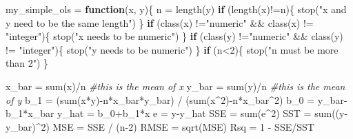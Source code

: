 \documentclass[
]{article}
\newenvironment{Shaded}{\begin{snugshade}}{\end{snugshade}}
\newcommand{\CommentTok}[1]{\textcolor[rgb]{0.56,0.35,0.01}{\textit{#1}}}
\newcommand{\ControlFlowTok}[1]{\textcolor[rgb]{0.13,0.29,0.53}{\textbf{#1}}}
\newcommand{\DecValTok}[1]{\textcolor[rgb]{0.00,0.00,0.81}{#1}}
\newcommand{\FunctionTok}[1]{\textcolor[rgb]{0.00,0.00,0.00}{#1}}
\newcommand{\NormalTok}[1]{#1}
\newcommand{\OtherTok}[1]{\textcolor[rgb]{0.56,0.35,0.01}{#1}}
\newcommand{\SpecialCharTok}[1]{\textcolor[rgb]{0.00,0.00,0.00}{#1}}
\newcommand{\StringTok}[1]{\textcolor[rgb]{0.31,0.60,0.02}{#1}}
\begin{document}
\begin{Shaded}
\begin{Highlighting}[]
\NormalTok{my\_simple\_ols }\OtherTok{=} \ControlFlowTok{function}\NormalTok{(x, y)\{}
\NormalTok{  n }\OtherTok{=} \FunctionTok{length}\NormalTok{(y)}
  \ControlFlowTok{if}\NormalTok{ (}\FunctionTok{length}\NormalTok{(x)}\SpecialCharTok{!=}\NormalTok{n)\{}
    \FunctionTok{stop}\NormalTok{(}\StringTok{"x and y need to be the same length"}\NormalTok{)}
\NormalTok{  \}}
  \ControlFlowTok{if}\NormalTok{ (}\FunctionTok{class}\NormalTok{(x) }\SpecialCharTok{!=}\StringTok{"numeric"} \SpecialCharTok{\&\&} \FunctionTok{class}\NormalTok{(x) }\SpecialCharTok{!=} \StringTok{"integer"}\NormalTok{)\{}
    \FunctionTok{stop}\NormalTok{(}\StringTok{"x needs to be numeric"}\NormalTok{)}
\NormalTok{  \}}
  \ControlFlowTok{if}\NormalTok{ (}\FunctionTok{class}\NormalTok{(y) }\SpecialCharTok{!=}\StringTok{"numeric"} \SpecialCharTok{\&\&} \FunctionTok{class}\NormalTok{(y) }\SpecialCharTok{!=} \StringTok{"integer"}\NormalTok{)\{}
    \FunctionTok{stop}\NormalTok{(}\StringTok{"y needs to be numeric"}\NormalTok{)}
\NormalTok{  \}}
  \ControlFlowTok{if}\NormalTok{ (n}\SpecialCharTok{\textless{}}\DecValTok{2}\NormalTok{)\{}
    \FunctionTok{stop}\NormalTok{(}\StringTok{"n must be more than 2"}\NormalTok{)}
\NormalTok{  \}}

\NormalTok{  x\_bar }\OtherTok{=} \FunctionTok{sum}\NormalTok{(x)}\SpecialCharTok{/}\NormalTok{n }\CommentTok{\#this is the mean of x}
\NormalTok{  y\_bar }\OtherTok{=} \FunctionTok{sum}\NormalTok{(y)}\SpecialCharTok{/}\NormalTok{n }\CommentTok{\#this is the mean of y}
\NormalTok{  b\_1 }\OtherTok{=}\NormalTok{ (}\FunctionTok{sum}\NormalTok{(x}\SpecialCharTok{*}\NormalTok{y)}\SpecialCharTok{{-}}\NormalTok{n}\SpecialCharTok{*}\NormalTok{x\_bar}\SpecialCharTok{*}\NormalTok{y\_bar) }\SpecialCharTok{/}\NormalTok{ (}\FunctionTok{sum}\NormalTok{(x}\SpecialCharTok{\^{}}\DecValTok{2}\NormalTok{)}\SpecialCharTok{{-}}\NormalTok{n}\SpecialCharTok{*}\NormalTok{x\_bar}\SpecialCharTok{\^{}}\DecValTok{2}\NormalTok{)}
\NormalTok{  b\_0 }\OtherTok{=}\NormalTok{ y\_bar}\SpecialCharTok{{-}}\NormalTok{b\_1}\SpecialCharTok{*}\NormalTok{x\_bar}
\NormalTok{  y\_hat }\OtherTok{=}\NormalTok{ b\_0}\SpecialCharTok{+}\NormalTok{b\_1}\SpecialCharTok{*}\NormalTok{x}
\NormalTok{  e }\OtherTok{=}\NormalTok{ y}\SpecialCharTok{{-}}\NormalTok{y\_hat}
\NormalTok{  SSE }\OtherTok{=} \FunctionTok{sum}\NormalTok{(e}\SpecialCharTok{\^{}}\DecValTok{2}\NormalTok{)}
\NormalTok{  SST }\OtherTok{=} \FunctionTok{sum}\NormalTok{((y}\SpecialCharTok{{-}}\NormalTok{y\_bar)}\SpecialCharTok{\^{}}\DecValTok{2}\NormalTok{)}
\NormalTok{  MSE }\OtherTok{=}\NormalTok{ SSE }\SpecialCharTok{/}\NormalTok{ (n}\DecValTok{{-}2}\NormalTok{)}
\NormalTok{  RMSE }\OtherTok{=} \FunctionTok{sqrt}\NormalTok{(MSE)}
\NormalTok{  Rsq }\OtherTok{=} \DecValTok{1} \SpecialCharTok{{-}}\NormalTok{ SSE}\SpecialCharTok{/}\NormalTok{SST}
  

\end{Highlighting}
\end{Shaded}
\end{document}
